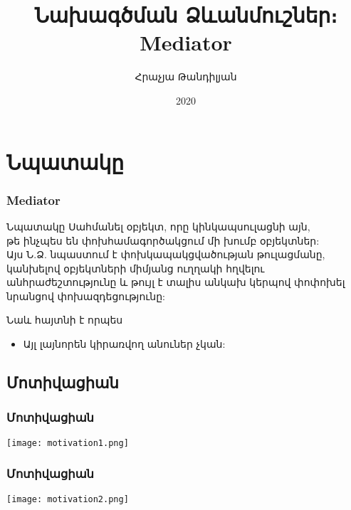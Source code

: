 \documentclass{beamer}
\begin{document}
\title[Mediator]{Նախագծման Ձևանմուշներ։ Mediator}
\author[Հրաչյա Թանդիլյան\copyright]{Հրաչյա Թանդիլյան}
\date{2020}

\begin{frame}
\titlepage
\end{frame}

\section{Նպատակը}
\begin{frame}\frametitle{Mediator}
\begin{block}{Նպատակը}
    Սահմանել օբյեկտ, որը կինկապսուլացնի այն,\\
    թե ինչպես են փոխհամագործակցում մի խումբ օբյեկտներ: \\
    Այս Ն.Ձ. նպաստում է փոխկապակցվածության թուլացմանը, կանխելով օբյեկտների
    միմյանց ուղղակի հղվելու անհրաժեշտությունը և թույլ է տալիս անկախ կերպով փոփոխել
    նրանցով փոխազդեցությունը:
\end{block}
\vfill
Նաև հայտնի է որպես
\begin{itemize}
    \item Այլ լայնորեն կիրառվող անուներ չկան:
\end{itemize}
\end{frame}

\subsection{Մոտիվացիան}
\begin{frame}\frametitle{Մոտիվացիան}
\begin{center}
    \texttt{[image: motivation1.png]}
\end{center}
\end{frame}

\begin{frame}\frametitle{Մոտիվացիան}
\begin{center}
    \texttt{[image: motivation2.png]}
\end{center}
\end{frame}
\end{document}
